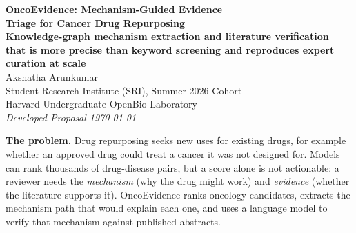 \documentclass[11pt]{article}
\begin{document}
\begin{center}
  {\LARGE\bfseries\color{sriblue} OncoEvidence: Mechanism-Guided Evidence\\ Triage for Cancer Drug Repurposing}\\[4pt]
  {\large\bfseries\color{sriblue!80!black} Knowledge-graph mechanism extraction and literature verification\\ that is more precise than keyword screening and reproduces expert curation at scale}\\[10pt]
  {\large Akshatha Arunkumar}\\[2pt]
  {\small Student Research Institute (SRI), Summer 2026 Cohort \\
  Harvard Undergraduate OpenBio Laboratory}\\[2pt]
  {\small\itshape Developed Proposal \quad\textbar\quad \today}
\end{center}

\vspace{2pt}
\begin{problembox}
\textbf{The problem.} Drug repurposing seeks new uses for existing drugs, for
example whether an approved drug could treat a cancer it was not designed for.
Models can rank thousands of drug-disease pairs, but a score alone is not
actionable: a reviewer needs the \emph{mechanism} (why the drug might work) and
\emph{evidence} (whether the literature supports it). OncoEvidence ranks oncology
candidates, extracts the mechanism path that would explain each one, and uses a
language model to verify that mechanism against published abstracts.
\end{problembox}
\end{document}
